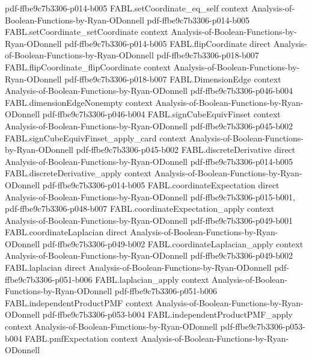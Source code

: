 \begin{theorem}
  {pdf-ffbe9c7b3306-p014-b005}
\proofstep
  {FABL.setCoordinate_eq_self}
  {context}
  {Analysis-of-Boolean-Functions-by-Ryan-ODonnell}
  {pdf-ffbe9c7b3306-p014-b005}
\proofstep
  {FABL.setCoordinate_setCoordinate}
  {context}
  {Analysis-of-Boolean-Functions-by-Ryan-ODonnell}
  {pdf-ffbe9c7b3306-p014-b005}
\proofstep
  {FABL.flipCoordinate}
  {direct}
  {Analysis-of-Boolean-Functions-by-Ryan-ODonnell}
  {pdf-ffbe9c7b3306-p018-b007}
\proofstep
  {FABL.flipCoordinate_flipCoordinate}
  {context}
  {Analysis-of-Boolean-Functions-by-Ryan-ODonnell}
  {pdf-ffbe9c7b3306-p018-b007}
\proofstep
  {FABL.DimensionEdge}
  {context}
  {Analysis-of-Boolean-Functions-by-Ryan-ODonnell}
  {pdf-ffbe9c7b3306-p046-b004}
\proofstep
  {FABL.dimensionEdgeNonempty}
  {context}
  {Analysis-of-Boolean-Functions-by-Ryan-ODonnell}
  {pdf-ffbe9c7b3306-p046-b004}
\proofstep
  {FABL.signCubeEquivFinset}
  {context}
  {Analysis-of-Boolean-Functions-by-Ryan-ODonnell}
  {pdf-ffbe9c7b3306-p045-b002}
\proofstep
  {FABL.signCubeEquivFinset_apply_card}
  {context}
  {Analysis-of-Boolean-Functions-by-Ryan-ODonnell}
  {pdf-ffbe9c7b3306-p045-b002}
\proofstep
  {FABL.discreteDerivative}
  {direct}
  {Analysis-of-Boolean-Functions-by-Ryan-ODonnell}
  {pdf-ffbe9c7b3306-p014-b005}
\proofstep
  {FABL.discreteDerivative_apply}
  {context}
  {Analysis-of-Boolean-Functions-by-Ryan-ODonnell}
  {pdf-ffbe9c7b3306-p014-b005}
\proofstep
  {FABL.coordinateExpectation}
  {direct}
  {Analysis-of-Boolean-Functions-by-Ryan-ODonnell}
  {pdf-ffbe9c7b3306-p015-b001,
    pdf-ffbe9c7b3306-p048-b007}
\proofstep
  {FABL.coordinateExpectation_apply}
  {context}
  {Analysis-of-Boolean-Functions-by-Ryan-ODonnell}
  {pdf-ffbe9c7b3306-p049-b001}
\proofstep
  {FABL.coordinateLaplacian}
  {direct}
  {Analysis-of-Boolean-Functions-by-Ryan-ODonnell}
  {pdf-ffbe9c7b3306-p049-b002}
\proofstep
  {FABL.coordinateLaplacian_apply}
  {context}
  {Analysis-of-Boolean-Functions-by-Ryan-ODonnell}
  {pdf-ffbe9c7b3306-p049-b002}
\proofstep
  {FABL.laplacian}
  {direct}
  {Analysis-of-Boolean-Functions-by-Ryan-ODonnell}
  {pdf-ffbe9c7b3306-p051-b006}
\proofstep
  {FABL.laplacian_apply}
  {context}
  {Analysis-of-Boolean-Functions-by-Ryan-ODonnell}
  {pdf-ffbe9c7b3306-p051-b006}
\proofstep
  {FABL.independentProductPMF}
  {context}
  {Analysis-of-Boolean-Functions-by-Ryan-ODonnell}
  {pdf-ffbe9c7b3306-p053-b004}
\proofstep
  {FABL.independentProductPMF_apply}
  {context}
  {Analysis-of-Boolean-Functions-by-Ryan-ODonnell}
  {pdf-ffbe9c7b3306-p053-b004}
\proofstep
  {FABL.pmfExpectation}
  {context}
  {Analysis-of-Boolean-Functions-by-Ryan-ODonnell}

\end{theorem}
